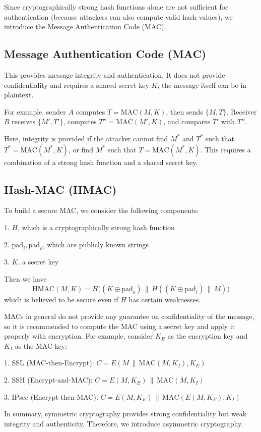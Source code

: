 Since cryptographically strong hash functions alone are not sufficient for authentication (because attackers can also compute valid hash values), we introduce the Message Authentication Code (MAC).

\subsection{Message Authentication Code (MAC)}
This provides message integrity and authentication. It does not provide confidentiality and requires a shared secret key \(K\); the message itself can be in plaintext. 

For example, sender \(A\) computes \(T = \text{MAC}(M, K)\), then sends \(\{M, T\}\). Receiver \(B\) receives \(\{M', T'\}\), computes \(T'' = \text{MAC}(M', K)\), and compares \(T'\) with \(T''\).

Here, integrity is provided if the attacker cannot find \(M^*\) and \(T^*\) such that \(T^* = \text{MAC}(M^*, K)\), or find \(M^*\) such that \(T = \text{MAC}(M^*, K)\). This requires a combination of a strong hash function and a shared secret key.

\subsection{Hash-MAC (HMAC)}
To build a secure MAC, we consider the following components:

1. \(H\), which is a cryptographically strong hash function

2. \(\text{pad}_i, \text{pad}_o\), which are publicly known strings

3. \(K\), a secret key

Then we have
\[
  \text{HMAC}(M, K) = H\big((K \oplus \text{pad}_o) \,\|\, H((K \oplus \text{pad}_i) \,\|\, M)\big)
\]
which is believed to be secure even if \(H\) has certain weaknesses.

MACs in general do not provide any guarantee on confidentiality of the message, so it is recommended to compute the MAC using a secret key and apply it properly with encryption. For example, consider \(K_E\) as the encryption key and \(K_I\) as the MAC key:

1. SSL (MAC-then-Encrypt): \(C = E(M \,\|\, \text{MAC}(M, K_I), K_E)\)

2. SSH (Encrypt-and-MAC): \(C = E(M, K_E) \,\|\, \text{MAC}(M, K_I)\)

3. IPsec (Encrypt-then-MAC): \(C = E(M, K_E) \,\|\, \text{MAC}(E(M, K_E), K_I)\)

In summary, symmetric cryptography provides strong confidentiality but weak integrity and authenticity. Therefore, we introduce asymmetric cryptography.